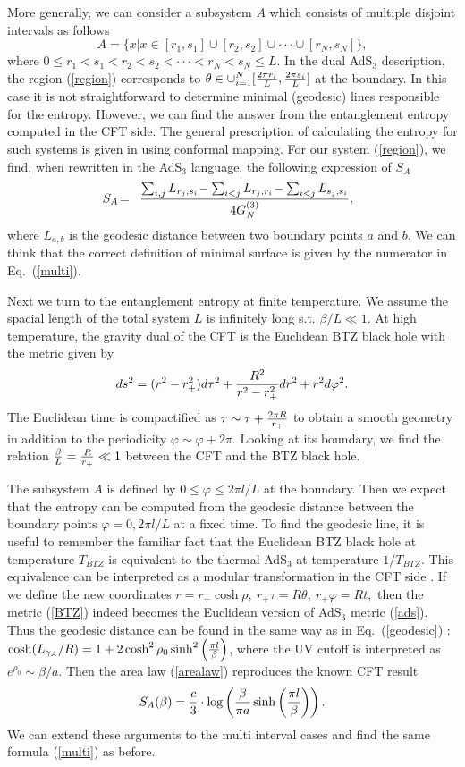 \documentclass[amsmath,amssymb,nofootinbib,eqsecnum,tighten,prd,12pt]{revtex4}
\def\frac#1#2{{#1\over #2}}
\def\f {\frac}
\def\ddd{\cdot\cdot\cdot}
\def\vp{\varphi}
\def\frac#1#2{{#1\over #2}}
\def\be{\begin{equation}}
\def\ee{\end{equation}}
\begin{document}
More generally,  we can consider a subsystem $A$ which consists of
multiple disjoint intervals as follows
 \be A=\{x|x\in [r_1,s_1]\cup [r_2,s_2]\cup \ddd \cup
[r_{N},s_{N}]\}, \label{region}
\ee
where $0\leq r_1<s_1<r_2< s_2<
\ddd < r_N<s_N\leq L$.  In the dual AdS$_3$ description,
the region (\ref{region})
corresponds to $\theta\in \cup_{i=1}^N[\frac{2\pi
r_i}{L},\frac{2\pi s_i}{L}]$ at the boundary. In this case it is not
straightforward to determine minimal (geodesic) lines responsible for the entropy.
However, we can find the answer from the entanglement entropy
computed in the CFT side.
 The general prescription of calculating
the entropy for such systems
is
given in \cite{Calabrese04}
using conformal mapping.
For our system (\ref{region}),
we find,
when rewritten in the AdS$_3$ language,
 the following expression of $S_A$
\begin{eqnarray}
S_A\!&=&\!\frac{
\sum_{i,j}L_{r_j,s_i}\!
-\sum_{i<j}L_{r_j,r_i}\!
-\sum_{i<j}L_{s_j,s_i}}{4G^{(3)}_N},~~ \label{multi}
\end{eqnarray}
where $L_{a,b}$ is the geodesic distance
between two boundary points $a$ and $b$.
We can think that the correct definition of minimal surface is given by the numerator
in Eq.\ (\ref{multi}).

Next we turn to the entanglement entropy at finite temperature.
We assume the spacial length of the total system $L$ is
infinitely long s.t. $\beta/L \ll 1$.
At high temperature, the gravity dual of the CFT is
the Euclidean BTZ black hole \cite{BTZ}
with the metric given by
\be
ds^2=(r^2-r_+^2)d\tau^2+ \f{R^2}{r^2-r^2_{+}}dr^2+r^2
d\vp^2. \label{BTZ}
\ee
The Euclidean time is compactified as $\tau\sim\tau+\f{2\pi
R}{r_+}$ to obtain a smooth geometry in addition to the periodicity
$\vp\sim \vp+2\pi$. Looking at its boundary, we
find the relation $\f{\beta}{L}=\f{R}{r_{+}}\ll 1$
between the CFT and the BTZ black hole.

The subsystem $A$ is defined by $0\leq \vp\leq 2\pi l/L$ at the
boundary. Then we expect
that the entropy can be computed from the geodesic distance
between the boundary points $\vp=0, 2\pi l/L$  at a fixed time. To find
the geodesic line, it is useful to remember the familiar fact that the
Euclidean BTZ black hole at temperature $T_{BTZ}$ is equivalent to the thermal
AdS$_3$ at temperature $1/T_{BTZ}$. This equivalence can be interpreted as
a modular transformation in the CFT side \cite{MS}. If we define the new
coordinates $r=r_{+}\cosh\rho,\
r_+\tau=R\theta,\  r_+\vp=Rt, $
then the metric  (\ref{BTZ})  indeed becomes the Euclidean version of AdS$_3$  metric
(\ref{ads}).
Thus the geodesic distance can be found in the same way
as in Eq.\ (\ref{geodesic}) : $\cosh(L_{\gamma_A}/R)
=1+2\cosh^2\rho_0\sinh^2\left(\f{\pi l}{\beta}\right)$,
where the UV cutoff is interpreted as $e^{\rho_0}\sim \beta/a$.
Then the area law
(\ref{arealaw}) reproduces the known CFT result \cite{Calabrese04}
\be
S_{A}(\beta)=\f{c}{3}\cdot\log\left(\f{\beta}{\pi a}\sinh\left(\f{\pi l}{
 \beta}\right)\right). \ee
We can extend these arguments to the multi interval cases and find the same
formula (\ref{multi}) as before.
\end{document}
